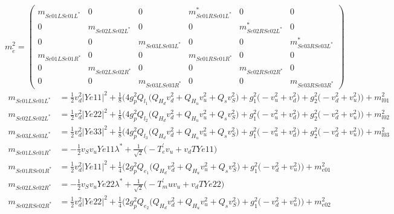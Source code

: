 \begin{itemize}
\begin{equation} 
m^2_{\tilde{e}} = \left( 
\begin{array}{cccccc}
m_{Se01LSe01L^*} &0 &0 &m^*_{Se01RSe01L^*} &0 &0\\ 
0 &m_{Se02LSe02L^*} &0 &0 &m^*_{Se02RSe02L^*} &0\\ 
0 &0 &m_{Se03LSe03L^*} &0 &0 &m^*_{Se03RSe03L^*}\\ 
m_{Se01LSe01R^*} &0 &0 &m_{Se01RSe01R^*} &0 &0\\ 
0 &m_{Se02LSe02R^*} &0 &0 &m_{Se02RSe02R^*} &0\\ 
0 &0 &m_{Se03LSe03R^*} &0 &0 &m_{Se03RSe03R^*}\end{array} 
\right) 
 \end{equation} 
\begin{align} 
m_{Se01LSe01L^*} &= \frac{1}{2} v_{d}^{2} |Ye11|^2  + \frac{1}{8} \Big(4 g_{p}^{2} Q_{l_1} \Big(Q_{H_d} v_{d}^{2}  + Q_{H_u} v_{u}^{2}  + Q_s v_{S}^{2} \Big) + g_{1}^{2} \Big(- v_{u}^{2}  + v_{d}^{2}\Big) + g_{2}^{2} \Big(- v_{d}^{2}  + v_{u}^{2}\Big)\Big) + m^2_{l01}\\ 
m_{Se02LSe02L^*} &= \frac{1}{2} v_{d}^{2} |Ye22|^2  + \frac{1}{8} \Big(4 g_{p}^{2} Q_{l_2} \Big(Q_{H_d} v_{d}^{2}  + Q_{H_u} v_{u}^{2}  + Q_s v_{S}^{2} \Big) + g_{1}^{2} \Big(- v_{u}^{2}  + v_{d}^{2}\Big) + g_{2}^{2} \Big(- v_{d}^{2}  + v_{u}^{2}\Big)\Big) + m^2_{l02}\\ 
m_{Se03LSe03L^*} &= \frac{1}{2} v_{d}^{2} |Ye33|^2  + \frac{1}{8} \Big(4 g_{p}^{2} Q_{l_3} \Big(Q_{H_d} v_{d}^{2}  + Q_{H_u} v_{u}^{2}  + Q_s v_{S}^{2} \Big) + g_{1}^{2} \Big(- v_{u}^{2}  + v_{d}^{2}\Big) + g_{2}^{2} \Big(- v_{d}^{2}  + v_{u}^{2}\Big)\Big) + m^2_{l03}\\ 
m_{Se01LSe01R^*} &= -\frac{1}{2} v_S v_u Ye11 \lambda^*  + \frac{1}{\sqrt{2}} \Big(- T^{\prime}_e v_u  + v_d TYe11 \Big)\\ 
m_{Se01RSe01R^*} &= \frac{1}{2} v_{d}^{2} |Ye11|^2  + \frac{1}{4} \Big(2 g_{p}^{2} Q_{e_{1}} \Big(Q_{H_d} v_{d}^{2}  + Q_{H_u} v_{u}^{2}  + Q_s v_{S}^{2} \Big) + g_{1}^{2} \Big(- v_{d}^{2}  + v_{u}^{2}\Big)\Big) + m^2_{e01}\\ 
m_{Se02LSe02R^*} &= -\frac{1}{2} v_S v_u Ye22 \lambda^*  + \frac{1}{\sqrt{2}} \Big(- T^{\prime}_mu v_u  + v_d TYe22 \Big)\\ 
m_{Se02RSe02R^*} &= \frac{1}{2} v_{d}^{2} |Ye22|^2  + \frac{1}{4} \Big(2 g_{p}^{2} Q_{e_{2}} \Big(Q_{H_d} v_{d}^{2}  + Q_{H_u} v_{u}^{2}  + Q_s v_{S}^{2} \Big) + g_{1}^{2} \Big(- v_{d}^{2}  + v_{u}^{2}\Big)\Big) + m^2_{e02}\\ 

\end{align}
\end{itemize}
